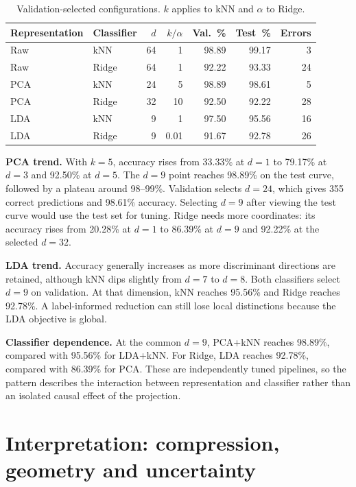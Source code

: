 \documentclass[11pt,a4paper]{article}
\newcommand{\method}[1]{\textbf{#1}}
\begin{document}
\begin{table}[htbp]
\centering
\small
\caption{Validation-selected configurations. $k$ applies to kNN and $\alpha$ to Ridge.}
\label{tab:configurations}
\begin{tabular}{@{}l l r r r r r@{}}
\toprule
Representation & Classifier & $d$ & $k/\alpha$ & Val.\ \% & Test\ \% & Errors \\
\midrule
Raw & kNN & 64 & 1 & 98.89 & 99.17 & 3 \\
Raw & Ridge & 64 & 1 & 92.22 & 93.33 & 24 \\
PCA & kNN & 24 & 5 & 98.89 & 98.61 & 5 \\
PCA & Ridge & 32 & 10 & 92.50 & 92.22 & 28 \\
LDA & kNN & 9 & 1 & 97.50 & 95.56 & 16 \\
LDA & Ridge & 9 & 0.01 & 91.67 & 92.78 & 26 \\
\bottomrule
\end{tabular}
\end{table}

\method{PCA trend.} With $k=5$, accuracy rises from 33.33\% at $d=1$ to 79.17\% at $d=3$ and 92.50\% at $d=5$. The $d=9$ point reaches 98.89\% on the test curve, followed by a plateau around 98--99\%. Validation selects $d=24$, which gives 355 correct predictions and 98.61\% accuracy. Selecting $d=9$ after viewing the test curve would use the test set for tuning. Ridge needs more coordinates: its accuracy rises from 20.28\% at $d=1$ to 86.39\% at $d=9$ and 92.22\% at the selected $d=32$.

\method{LDA trend.} Accuracy generally increases as more discriminant directions are retained, although kNN dips slightly from $d=7$ to $d=8$. Both classifiers select $d=9$ on validation. At that dimension, kNN reaches 95.56\% and Ridge reaches 92.78\%. A label-informed reduction can still lose local distinctions because the LDA objective is global.

\method{Classifier dependence.} At the common $d=9$, PCA+kNN reaches 98.89\%, compared with 95.56\% for LDA+kNN. For Ridge, LDA reaches 92.78\%, compared with 86.39\% for PCA. These are independently tuned pipelines, so the pattern describes the interaction between representation and classifier rather than an isolated causal effect of the projection.

\section{Interpretation: compression, geometry and uncertainty}
\end{document}
